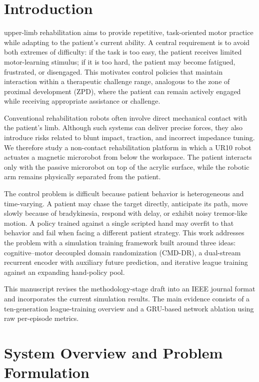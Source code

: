 \documentclass[lettersize,journal]{IEEEtran}
\begin{document}
\section{Introduction}
 upper-limb rehabilitation aims to provide repetitive, task-oriented motor practice while adapting to the patient's current ability. A central requirement is to avoid both extremes of difficulty: if the task is too easy, the patient receives limited motor-learning stimulus; if it is too hard, the patient may become fatigued, frustrated, or disengaged. This motivates control policies that maintain interaction within a therapeutic challenge range, analogous to the zone of proximal development (ZPD), where the patient can remain actively engaged while receiving appropriate assistance or challenge.

Conventional rehabilitation robots often involve direct mechanical contact with the patient's limb. Although such systems can deliver precise forces, they also introduce risks related to blunt impact, traction, and incorrect impedance tuning. We therefore study a non-contact rehabilitation platform in which a UR10 robot actuates a magnetic microrobot from below the workspace. The patient interacts only with the passive microrobot on top of the acrylic surface, while the robotic arm remains physically separated from the patient.

The control problem is difficult because patient behavior is heterogeneous and time-varying. A patient may chase the target directly, anticipate its path, move slowly because of bradykinesia, respond with delay, or exhibit noisy tremor-like motion. A policy trained against a single scripted hand may overfit to that behavior and fail when facing a different patient strategy. This work addresses the problem with a simulation training framework built around three ideas: cognitive--motor decoupled domain randomization (CMD-DR), a dual-stream recurrent encoder with auxiliary future prediction, and iterative league training against an expanding hand-policy pool.

This manuscript revises the methodology-stage draft into an IEEE journal format and incorporates the current simulation results. The main evidence consists of a ten-generation league-training overview and a GRU-based network ablation using raw per-episode metrics.

\section{System Overview and Problem Formulation}
\end{document}
